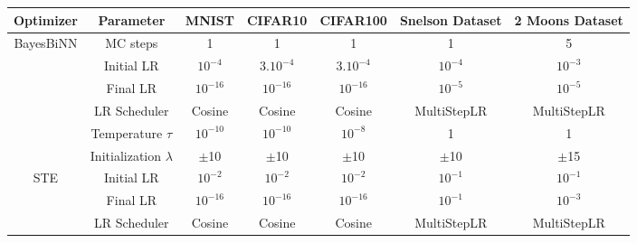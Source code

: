 \begin{table}[h]
\begin{center}
\begin{tabular}{ | c | c | c | c | c | c | c | }
\hline
  Optimizer & Parameter & MNIST & CIFAR10 & CIFAR100 & Snelson Dataset & 2 Moons Dataset \\ \hline
  \multirow{6}{5em}{BayesBiNN} & MC steps & 1 & 1 & 1 & 1 & 5 \\
   & Initial LR & $10^{-4}$ & $3.10^{-4}$ & $3.10^{-4}$ & $10^{-4}$ & $10^{-3}$ \\
   & Final LR & $10^{-16}$ & $10^{-16}$ & $10^{-16}$ & $10^{-5}$ & $10^{-5}$ \\
   & LR Scheduler & Cosine & Cosine & Cosine & MultiStepLR & MultiStepLR \\
   & Temperature $\tau$ & $10^{-10}$ & $10^{-10}$ & $10^{-8}$ & 1 & 1 \\
   & Initialization $\lambda$ & $\pm$10 & $\pm$10 & $\pm$10 & $\pm$10 & $\pm$15 \\ \hline
   
   
  \multirow{3}{5em}{STE} 
   & Initial LR & $10^{-2}$ & $10^{-2}$ & $10^{-2}$ & $10^{-1}$ & $10^{-1}$ \\
   & Final LR & $10^{-16}$ & $10^{-16}$ & $10^{-16}$ & $10^{-1}$ & $10^{-3}$ \\
   & LR Scheduler & Cosine & Cosine & Cosine & MultiStepLR & MultiStepLR \\
\hline
   
   

\end{tabular}
\end{center}
\end{table}

